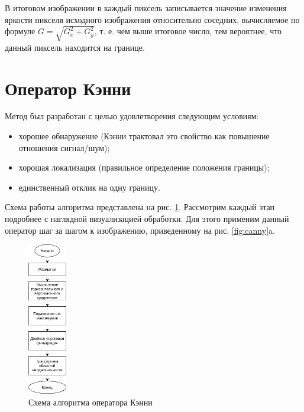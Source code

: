 В итоговом изображении в каждый пиксель записывается значение изменения яркости пикселя исходного изображения относительно соседних, вычисляемое по формуле $G=\sqrt{G_x^2+G_y^2}$, т. е. чем выше итоговое число, тем вероятнее, что данный пиксель находится на границе.

\section*{Оператор Кэнни}

Метод\cite{Canny} был разработан с целью удовлетворения следующим условиям:

\begin{itemize}
	\item хорошее обнаружение (Кэнни трактовал это свойство как повышение отношения сигнал/шум);
	\item хорошая локализация (правильное определение положения границы);
	\item единственный отклик на одну границу.
\end{itemize}

Схема работы алгоритма представлена на рис. \ref{an:canny}. Рассмотрим каждый этап подробнее с наглядной визуализацией обработки. Для этого применим данный оператор шаг за шагом к изображению, приведенному на рис. \ref{fig:canny}a.

\begin{figure}[!h]
	\centering
	\includegraphics[width=0.15\textwidth]{inc/img/canny-block}
	\caption{Схема алгоритма оператора Кэнни}
	\label{an:canny}
\end{figure}

